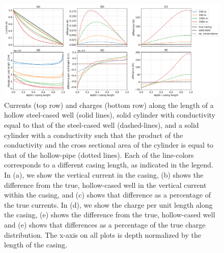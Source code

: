 \begin{figure}
    \begin{center}
    \includegraphics[width=\textwidth]{figures/approximating_wells_currents_charges.png}
    \end{center}
\caption{
    Currents (top row) and charges (bottom row) along the length of
    a hollow steel-cased well (solid lines), solid cylinder with
    conductivity equal to that of the steel-cased well (dashed-lines),
    and a solid cylinder with a conductivity such that the product of the
    conductivity and the cross sectional area of the cylinder is equal to that
    of the hollow-pipe (dotted lines). Each of the line-colors corresponds to a
    different casing length, as indicated in the legend.
    In (a), we show the vertical current in the casing,
    (b) shows the difference from the true, hollow-cased well
    in the vertical current within the casing, and (c) shows that difference as a percentage
    of the true currents. In (d), we show the charge per unit length along the casing, (e)
    shows the difference from the true, hollow-cased well and (e) shows that differences as
    a percentage of the true charge distribution.
    The x-axis on all plots is depth normalized by the length of the casing.
}
\label{fig:approximating_wells_currents_charges}
\end{figure}
